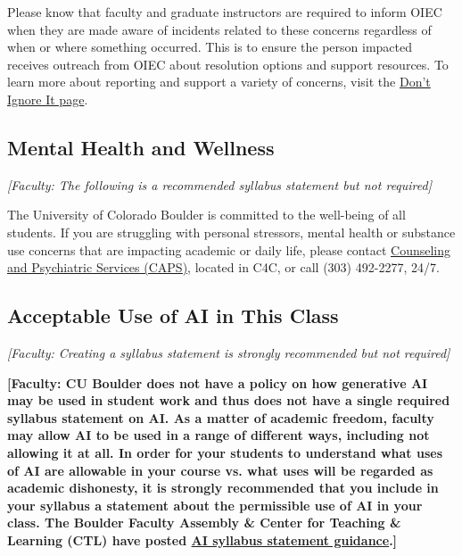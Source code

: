 Please know that faculty and graduate instructors are required to inform OIEC when they are made aware of incidents related to these concerns regardless of when or where something occurred. This is to ensure the person impacted receives outreach from OIEC about resolution options and support resources. To learn more about reporting and support a variety of concerns, visit the \href{https://www.colorado.edu/dontignoreit/}{Don't Ignore It page}.

\subsection*{Mental Health and Wellness}
\textit{[Faculty: The following is a recommended syllabus statement but not required]}

The University of Colorado Boulder is committed to the well-being of all students. If you are struggling with personal stressors, mental health or substance use concerns that are impacting academic or daily life, please contact \href{https://www.colorado.edu/counseling/}{Counseling and Psychiatric Services (CAPS)}, located in C4C, or call (303) 492-2277, 24/7.

\subsection*{Acceptable Use of AI in This Class}
\textit{[Faculty: Creating a syllabus statement is strongly recommended but not required]}

\textbf{[Faculty: CU Boulder does not have a policy on how generative AI may be used in student work and thus does not have a single required syllabus statement on AI. As a matter of academic freedom, faculty may allow AI to be used in a range of different ways, including not allowing it at all. In order for your students to understand what uses of AI are allowable in your course vs. what uses will be regarded as academic dishonesty, it is strongly recommended that you include in your syllabus a statement about the permissible use of AI in your class. The Boulder Faculty Assembly \& Center for Teaching \& Learning (CTL) have posted \href{http://colorado.edu/center/teaching-learning/teaching-technology-ai/teaching-ai/ai-syllabus-statements}{AI syllabus statement guidance}.]}
